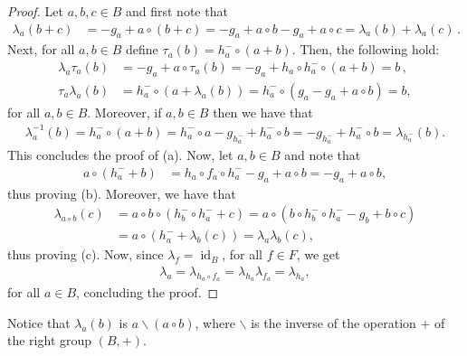 \documentclass[11pt]{amsart}
\newcommand{\id}{\operatorname{id}}
\theoremstyle{definition}
\begin{document}
    \begin{proof}
        Let $a, b, c \in B$ and first note that
        \begin{align*}
            \lambda_a(b+c) &= -g_a + a \circ (b+c)
            = -g_a + a \circ b -g_a + a \circ c
            = \lambda_a(b) + \lambda_a(c) \,.
        \end{align*}
        Next, for all $a, b \in B$ define $\tau_a(b) = h_a^- \circ (a+b)$. 
        Then, the following hold:
        \begin{align*}
            \lambda_a\tau_a(b) &= -g_a + a \circ \tau_a(b) 
            = -g_a + h_a \circ h_a^- \circ (a+b)
            = b \,, \\
            \tau_a\lambda_a(b) &=
            h_a^- \circ (a + \lambda_a(b))
            = h_a^- \circ (g_a - g_a + a \circ b)
            = b,
        \end{align*}
        for all $a, b \in B$. Moreover, if $a, b \in B$ then we have that
        \begin{align*}
            \lambda_a^{-1}(b) =
            h_a^- \circ (a+b) 
            = h_a^- \circ a -g_{h_a^-} + h_a^- \circ b = -g_{h_a^-} + h_a^- \circ b 
            = \lambda_{h_a^-}(b).
        \end{align*} This concludes the proof of {\rm (a)}.
         Now, let $a, b \in B$ and note that 
        \begin{align*}
            a \circ \left(h_a^-+b\right) 
            &= h_a\circ f_a \circ h_a^--g_a+a \circ b 
            =-g_a+a \circ b, 
        \end{align*}
        thus proving {\rm (b)}. Moreover, we have that
    \begin{align*}
        \lambda_{a\circ b}(c)
        &= a\circ b\circ(h_b^-\circ h_a^- +c)
        = a\circ\left(b\circ h_b^-\circ h_a^- -g_b + b\circ c\right) \\
        &= a\circ\left(h_a^- +\lambda_b(c)\right) = \lambda_a\lambda_b(c),
    \end{align*} 
thus proving {\rm (c)}.
Now, since $\lambda_f = \id_B$, for all $f \in F$, we get
 \begin{align*}
     \lambda_a = \lambda_{h_a \circ f_a} = \lambda_{h_a}\lambda_{f_a} = \lambda_{h_a},
 \end{align*}
 for all $a \in B$, concluding the proof. 
\end{proof}

\smallskip

Notice that $\lambda_a(b)$ is $ a\backslash (a \circ b)$, where $\backslash$ is the inverse of the operation $+$ of the right group $(B,+)$.
\end{document}

